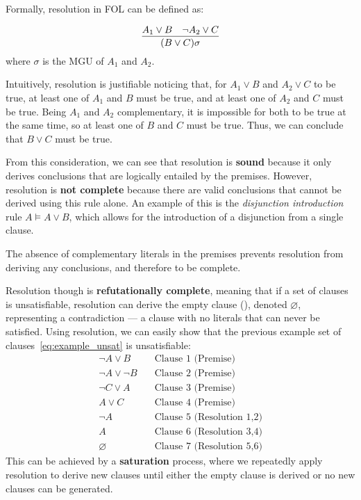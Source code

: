Formally, resolution in FOL can be defined as:

\begin{equation}
  \infer{(B\lor C)\sigma}{A_1 \lor B & \neg A_2 \lor C}
\end{equation}
\indent where \(\sigma\) is the MGU of \(A_1\) and \(A_2\).

\noindent Intuitively, resolution is justifiable noticing that, for \(A_1 \lor B\) and \(A_2 \lor C\) to be true, at least one of \(A_1\) and \(B\) must be true, and at least one of \(A_2\) and \(C\) must be true.
Being \(A_1\) and \(A_2\) complementary, it is impossible for both to be true at the same time, so at least one of \(B\) and \(C\) must be true. Thus, we can conclude that \(B \lor C\) must be true.

From this consideration, we can see that resolution is \textbf{sound} because it only derives conclusions that are logically entailed by the premises.
However, resolution is \textbf{not complete} because there are valid conclusions that cannot be derived using this rule alone.
An example of this is the \emph{disjunction introduction} rule \(A \models A \lor B\), which allows for the introduction of a disjunction from a single clause.

The absence of complementary literals in the premises prevents resolution from deriving any conclusions, and therefore to be complete.

Resolution though is \textbf{refutationally complete}, meaning that if a set of clauses is unsatisfiable, resolution can derive the empty clause (\citeauthor{robinson1965}\cite{robinson1965}), denoted \(\varnothing\), representing a contradiction --- a clause with no literals that can never be satisfied.
Using resolution, we can easily show that the previous example set of clauses~\ref{eq:example_unsat} is unsatisfiable:
\begin{equation}
  \begin{aligned}
    \neg A \lor B &\quad \text{Clause 1 (Premise)} \\
    \neg A \lor \neg B &\quad \text{Clause 2 (Premise)} \\
    \neg C \lor A &\quad \text{Clause 3 (Premise)} \\
    A \lor C &\quad \text{Clause 4 (Premise)} \\
    \neg A &\quad \text{Clause 5 (Resolution 1,2)} \\
    A &\quad \text{Clause 6 (Resolution 3,4)} \\
    \varnothing &\quad \text{Clause 7 (Resolution 5,6)}
  \end{aligned}
\end{equation}
This can be achieved by a \textbf{saturation} process, where we repeatedly apply resolution to derive new clauses until either the empty clause is derived or no new clauses can be generated.

